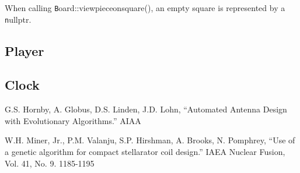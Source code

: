 \documentclass[letter]{article}
\newcommand{\code}[1]{{\texttt #1}}
\renewcommand\_{\textunderscore\allowbreak}
\begin{document}
When calling \code{Board::view\_piece\_on\_square()}, an empty square is represented by a \code{nullptr}.

\subsection{Player}

\subsection{Clock}



\begin{thebibliography}{9}

G.S. Hornby, A. Globus, D.S. Linden, J.D. Lohn, ``Automated Antenna Design with Evolutionary Algorithms.'' AIAA

W.H. Miner, Jr., P.M. Valanju, S.P. Hirshman, A. Brooks, N. Pomphrey, ``Use of a genetic algorithm for compact stellarator coil design.'' IAEA Nuclear Fusion, Vol. 41, No. 9. 1185-1195

\end{thebibliography}
\end{document}
